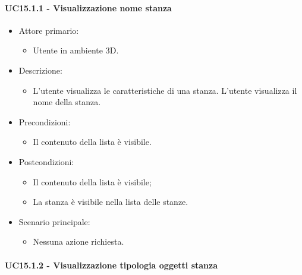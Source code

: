 \paragraph{UC15.1.1 - Visualizzazione nome stanza}

\begin{itemize}

	\item Attore primario: 
	\begin{itemize}
		\item Utente in ambiente 3D.
	\end{itemize}
	\item Descrizione:
	\begin{itemize}
		\item L'utente visualizza le caratteristiche di una stanza.
		\newline L'utente visualizza il nome della stanza.
	\end{itemize}
	
	\item Precondizioni:
	\begin{itemize}
		\item Il contenuto della lista è visibile.
	\end{itemize}
	
	\item Postcondizioni:
	\begin{itemize}
		\item Il contenuto della lista è visibile;
		\item La stanza è visibile nella lista delle stanze.
	\end{itemize}
	
	\item Scenario principale:
	\begin{itemize}
		\item Nessuna azione richiesta.
	\end{itemize}
	
\end{itemize}


\paragraph{UC15.1.2 - Visualizzazione tipologia oggetti stanza}

